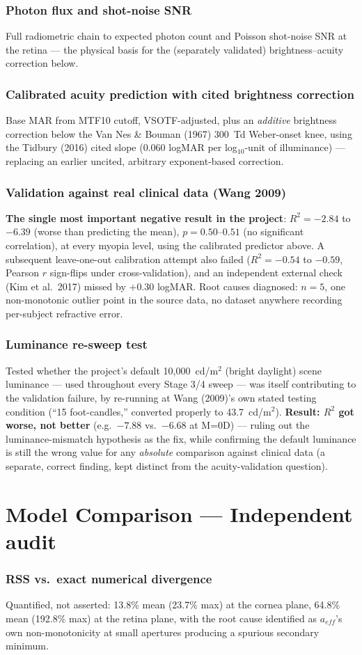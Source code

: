 \documentclass[10pt]{report}
\newcommand{\feat}[1]{\subsection*{#1}}
\begin{document}
\feat{Photon flux and shot-noise SNR}
Full radiometric chain to expected photon count and Poisson shot-noise SNR at the retina --- the physical basis for the (separately validated) brightness--acuity correction below.

\feat{Calibrated acuity prediction with cited brightness correction}
Base MAR from MTF10 cutoff, VSOTF-adjusted, plus an \emph{additive} brightness correction below the Van Nes \& Bouman (1967) 300~Td Weber-onset knee, using the Tidbury (2016) cited slope (0.060 logMAR per log$_{10}$-unit of illuminance) --- replacing an earlier uncited, arbitrary exponent-based correction.

\feat{Validation against real clinical data (Wang 2009)}
\textbf{The single most important negative result in the project}: $R^2=-2.84$ to $-6.39$ (worse than predicting the mean), $p=0.50$--$0.51$ (no significant correlation), at every myopia level, using the calibrated predictor above. A subsequent leave-one-out calibration attempt also failed ($R^2=-0.54$ to $-0.59$, Pearson $r$ sign-flips under cross-validation), and an independent external check (Kim et al.\ 2017) missed by $+0.30$ logMAR. Root causes diagnosed: $n=5$, one non-monotonic outlier point in the source data, no dataset anywhere recording per-subject refractive error.

\feat{Luminance re-sweep test}
\label{sec:luminance}
Tested whether the project's default 10{,}000~cd/m$^2$ (bright daylight) scene luminance --- used throughout every Stage 3/4 sweep --- was itself contributing to the validation failure, by re-running at Wang (2009)'s own stated testing condition (``15 foot-candles,'' converted properly to 43.7~cd/m$^2$). \textbf{Result: $R^2$ got worse, not better} (e.g.\ $-7.88$ vs.\ $-6.68$ at M=0D) --- ruling out the luminance-mismatch hypothesis as the fix, while confirming the default luminance is still the wrong value for any \emph{absolute} comparison against clinical data (a separate, correct finding, kept distinct from the acuity-validation question).

\chapter{Model Comparison --- Independent audit}
\feat{RSS vs.\ exact numerical divergence}
Quantified, not asserted: 13.8\% mean (23.7\% max) at the cornea plane, 64.8\% mean (192.8\% max) at the retina plane, with the root cause identified as $a_{eff}$'s own non-monotonicity at small apertures producing a spurious secondary minimum.
\end{document}
